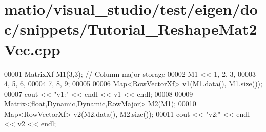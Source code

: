 \hypertarget{matio_2visual__studio_2test_2eigen_2doc_2snippets_2_tutorial___reshape_mat2_vec_8cpp_source}{}\section{matio/visual\+\_\+studio/test/eigen/doc/snippets/\+Tutorial\+\_\+\+Reshape\+Mat2\+Vec.cpp}
\label{matio_2visual__studio_2test_2eigen_2doc_2snippets_2_tutorial___reshape_mat2_vec_8cpp_source}

\begin{DoxyCode}
00001 MatrixXf M1(3,3);    \textcolor{comment}{// Column-major storage}
00002 M1 << 1, 2, 3,
00003       4, 5, 6,
00004       7, 8, 9;
00005 
00006 Map<RowVectorXf> v1(M1.data(), M1.size());
00007 cout << \textcolor{stringliteral}{"v1:"} << endl << v1 << endl;
00008 
00009 Matrix<float,Dynamic,Dynamic,RowMajor> M2(M1);
00010 Map<RowVectorXf> v2(M2.data(), M2.size());
00011 cout << \textcolor{stringliteral}{"v2:"} << endl << v2 << endl;
\end{DoxyCode}
